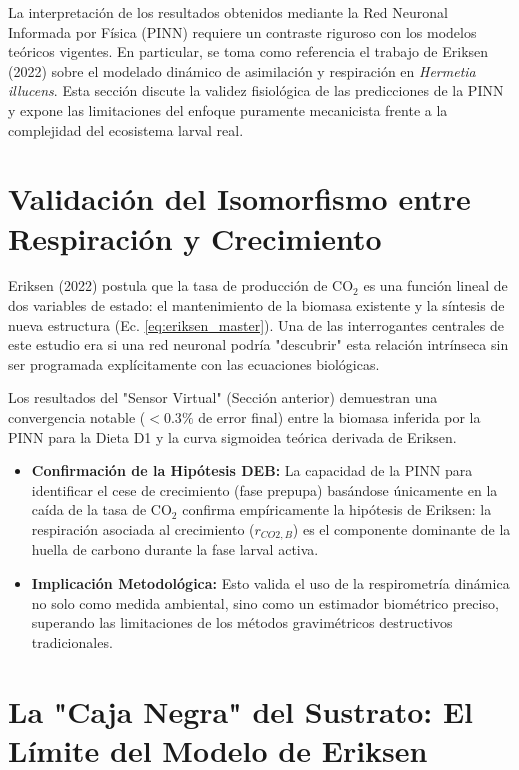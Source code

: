 La interpretación de los resultados obtenidos mediante la Red Neuronal Informada por Física (PINN) requiere un contraste riguroso con los modelos teóricos vigentes. En particular, se toma como referencia el trabajo de Eriksen (2022) sobre el modelado dinámico de asimilación y respiración en \textit{Hermetia illucens}. Esta sección discute la validez fisiológica de las predicciones de la PINN y expone las limitaciones del enfoque puramente mecanicista frente a la complejidad del ecosistema larval real.

\section{Validación del Isomorfismo entre Respiración y Crecimiento}

Eriksen (2022) postula que la tasa de producción de CO$_2$ es una función lineal de dos variables de estado: el mantenimiento de la biomasa existente y la síntesis de nueva estructura (Ec. \ref{eq:eriksen_master}). Una de las interrogantes centrales de este estudio era si una red neuronal podría "descubrir" esta relación intrínseca sin ser programada explícitamente con las ecuaciones biológicas.

Los resultados del "Sensor Virtual" (Sección anterior) demuestran una convergencia notable ($<0.3\%$ de error final) entre la biomasa inferida por la PINN para la Dieta D1 y la curva sigmoidea teórica derivada de Eriksen.
\begin{itemize}
    \item \textbf{Confirmación de la Hipótesis DEB:} La capacidad de la PINN para identificar el cese de crecimiento (fase prepupa) basándose únicamente en la caída de la tasa de CO$_2$ confirma empíricamente la hipótesis de Eriksen: la respiración asociada al crecimiento ($r_{CO2,B}$) es el componente dominante de la huella de carbono durante la fase larval activa.
    \item \textbf{Implicación Metodológica:} Esto valida el uso de la respirometría dinámica no solo como medida ambiental, sino como un estimador biométrico preciso, superando las limitaciones de los métodos gravimétricos destructivos tradicionales.
\end{itemize}

\section{La "Caja Negra" del Sustrato: El Límite del Modelo de Eriksen}

